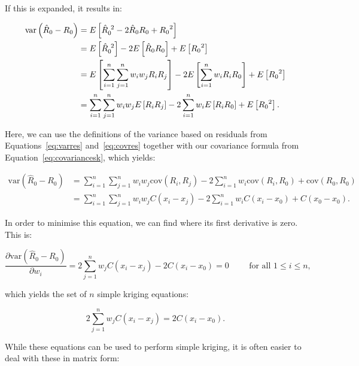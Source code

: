 If this is expanded, it results in:

\begin{align}
\mathrm{var}\left(\hat{R}_0 - R_0\right) &= E\left[{\hat{R}_0}^{\hspace{1.2mm}2} - 2\hat{R}_0R_0 + {R_0}^2 \right] \nonumber \\
&= E\left[{\hat{R}_0}^{\hspace{1.2mm}2}\right] - 2E\left[\hat{R}_0R_0\right] + E\left[{R_0}^2 \right] \nonumber \\
&= E\left[\sum_{i=1}^n \sum_{j=1}^n w_i w_j R_i R_j\right] - 2E\left[\sum_{i=1}^n w_i R_i R_0\right] + E\left[{R_0}^2 \right] \nonumber \\
&= \sum_{i=1}^n \sum_{j=1}^n w_i w_j E\left[R_i R_j\right] - 2\sum_{i=1}^n w_i E\left[R_i R_0\right] + E\left[{R_0}^2 \right]. \nonumber
\end{align}

Here, we can use the definitions of the variance based on residuals from Equations~\ref{eq:varres} and~\ref{eq:covres} together with our covariance formula from Equation~\ref{eq:covariancesk}, which yields:

\begin{align}
\mathrm{var}\left(\hat{R}_0 - R_0\right) &= \sum_{i=1}^n \sum_{j=1}^n w_i w_j \mathrm{cov}(R_i, R_j) - 2\sum_{i=1}^n w_i \mathrm{cov}(R_i,R_0) + \mathrm{cov}(R_0, R_0) \label{eq:variancesk} \\
&= \sum_{i=1}^n \sum_{j=1}^n w_i w_j C(x_i-x_j) - 2\sum_{i=1}^n w_i C(x_i-x_0) + C(x_0-x_0).
\end{align}

In order to minimise this equation, we can find where its first derivative is zero.
This is:

\begin{equation}
\frac{\partial \mathrm{var}\left(\hat{R}_0 - R_0\right)}{\partial w_i} = 2 \sum_{j=1}^n w_j C(x_i-x_j) - 2C(x_i-x_0) = 0 \hspace{1cm} \text{for all } 1 \leq i \leq n, \nonumber
\end{equation}

which yields the set of \(n\) simple kriging equations:

\begin{equation}
2 \sum_{j=1}^n w_j C(x_i-x_j) = 2C(x_i-x_0).
\end{equation}

While these equations can be used to perform simple kriging, it is often easier to deal with these in matrix form:

